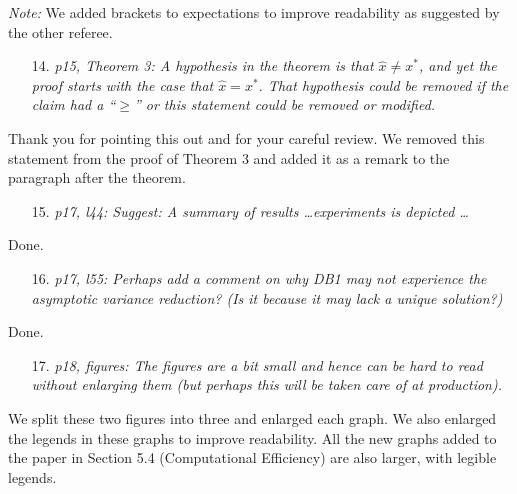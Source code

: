 \documentclass[11pt,notitlepage,onecolumn]{article}
\newcommand{\noi}{\noindent}
\begin{document}
\noi 
{\it Note:} We added brackets to expectations to improve readability as suggested by the other referee.
\medskip 


\begin{itemize}
\item[14.] \textit{p15, Theorem 3: A hypothesis in the theorem is that $\hat{x} \neq x^*$, and yet the proof starts with the case that $\hat{x} = x^*$. 
That hypothesis could be removed if the claim had a ``$\geq$'' or this statement could be removed or modified.}
\end{itemize}

\noindent Thank you for pointing this out and for your careful review.  
We removed this statement from the proof of Theorem 3 and added it as a remark to the paragraph after the theorem.
\medskip 



\begin{itemize}
\item[15.] \textit{p17, l44: Suggest: A summary of results \ldots experiments is depicted \ldots}
\end{itemize}

\noindent Done.
\medskip 


\begin{itemize}
\item[16.] \textit{p17, l55: Perhaps add a comment on why DB1 may not experience the asymptotic variance reduction? 
(Is it because it may lack a unique solution?)}
\end{itemize}

\noindent
Done.
\medskip 


\begin{itemize}
\item[17.] \textit{p18, figures: The figures are a bit small and hence can be hard to read without enlarging them (but perhaps this will be taken care of at production).}
\end{itemize}

\noindent 
We split these two figures into three and enlarged each graph. 
We also enlarged the legends in these graphs to improve readability.
All the new graphs added to the paper in Section 5.4 (Computational Efficiency) are also larger, with legible legends. 
\medskip 
\end{document}

